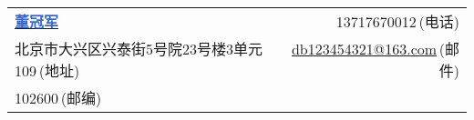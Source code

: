 \newcommand{\myheader}{
\begin{tabular*}{\textwidth}{l@{\extracolsep{\fill}}r}
  \textbf{\href{https://herechen.github.io}{\LARGE \textcolor{highlight}{董冠军}}} & 13717670012$\,${\color{labelgrey}(电话)} \\
  北京市大兴区兴泰街5号院23号楼3单元109$\,${\color{labelgrey}(地址)} & \href{mailto:db123454321@163.com}{db123454321@163.com}$\,${\color{labelgrey}(邮件)} \\
  102600$\,${\color{labelgrey}(邮编)} \\
\end{tabular*}\\\vspace{0.1in}}

\myheader
